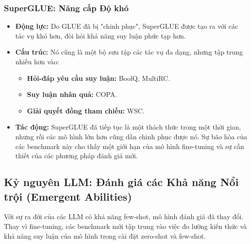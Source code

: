 \subsubsection{SuperGLUE: Nâng cấp Độ khó}
\begin{itemize}
    \item \textbf{Động lực:} Do GLUE đã bị "chinh phục", SuperGLUE được tạo ra với các tác vụ khó hơn, đòi hỏi khả năng suy luận phức tạp hơn.
    \item \textbf{Cấu trúc:} Nó cũng là một bộ sưu tập các tác vụ đa dạng, nhưng tập trung nhiều hơn vào:
        \begin{itemize}
            \item \textbf{Hỏi-đáp yêu cầu suy luận:} BoolQ, MultiRC.
            \item \textbf{Suy luận nhân quả:} COPA.
            \item \textbf{Giải quyết đồng tham chiếu:} WSC.
        \end{itemize}
    \item \textbf{Tác động:} SuperGLUE đã tiếp tục là một thách thức trong một thời gian, nhưng rồi các mô hình lớn hơn cũng dần chinh phục được nó. Sự bão hòa của các benchmark này cho thấy một giới hạn của mô hình fine-tuning và sự cần thiết của các phương pháp đánh giá mới.
\end{itemize}

\subsection{Kỷ nguyên LLM: Đánh giá các Khả năng Nổi trội (Emergent Abilities)}
\label{ssec:llm_benchmarks}
Với sự ra đời của các LLM có khả năng few-shot, mô hình đánh giá đã thay đổi. Thay vì fine-tuning, các benchmark mới tập trung vào việc đo lường kiến thức và khả năng suy luận của mô hình trong cài đặt zero-shot và few-shot.

